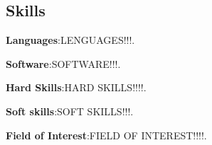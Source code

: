\documentclass[a4paper, 9pt]{article}
\begin{document}
\subsection*{}
\subsection*{Skills}

\textbf {Languages}:\small LENGUAGES!!!.

\noindent \textbf{Software}:\small SOFTWARE!!!.

\noindent \textbf{Hard Skills}:\small HARD SKILLS!!!!. 

\noindent \textbf{Soft skills}:\small SOFT SKILLS!!!.

\noindent \textbf{Field of Interest}:\small FIELD OF INTEREST!!!!.
\end{document}

